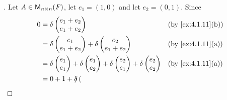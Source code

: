 \begin{proof}[]
  Let \(A \in \ms[n][n][\F]\), let \(e_1 = (1, 0)\) and let \(e_2 = (0, 1)\).
  Since
  \begin{align*}
    0 & = \delta\begin{pmatrix}
                  e_1 + e_2 \\
                  e_1 + e_2
                \end{pmatrix}               &  & \by{ex:4.1.11}[b]                                                     \\
      & = \delta\begin{pmatrix}
                  e_1 \\
                  e_1 + e_2
                \end{pmatrix} + \delta\begin{pmatrix}
                                        e_2 \\
                                        e_1 + e_2
                                      \end{pmatrix} &  & \by{ex:4.1.11}[a]                                             \\
      & = \delta\begin{pmatrix}
                  e_1 \\
                  e_1
                \end{pmatrix} + \delta\begin{pmatrix}
                                        e_1 \\
                                        e_2
                                      \end{pmatrix} + \delta\begin{pmatrix}
                                                              e_2 \\
                                                              e_1
                                                            \end{pmatrix} + \delta\begin{pmatrix}
                                                                                    e_2 \\
                                                                                    e_2
                                                                                  \end{pmatrix} &  & \by{ex:4.1.11}[a] \\
      & = 0 + 1 + \delta\begin{pmatrix}

\end{pmatrix}
\end{align*}
\end{proof}
